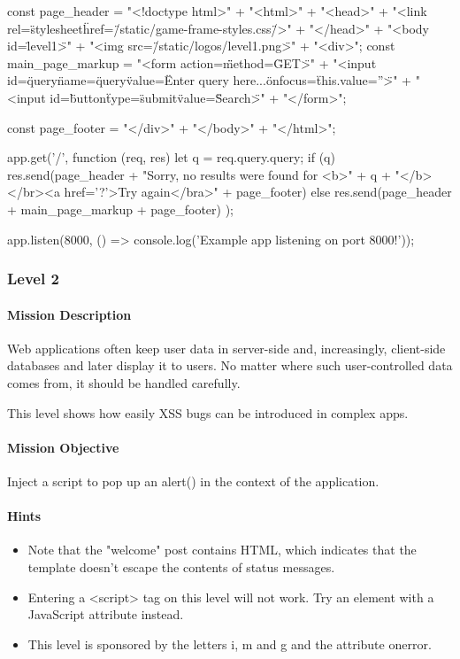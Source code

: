 \begin{Exercise}[label={websec-xss-game}]
\begin{js}
const page_header = "<!doctype html>" +
  "<html>" +
  "<head>" +
  "<link rel=\"stylesheet\" href=\"/static/game-frame-styles.css\" />" +
  "</head>" +
  "<body id=\"level1\">" +
  "<img src=\"/static/logos/level1.png\">" +
  "<div>";
const main_page_markup =
  "<form action=\"\" method=\"GET\">" +
  "<input id=\"query\" 
  name=\"query\" 
  value=\"Enter query here...\" 
  onfocus=\"this.value=''\">" +
  "<input id=\"button\" type=\"submit\" value=\"Search\">" +
  "</form>";

const page_footer =
  "</div>" +
  "</body>" +
  "</html>";

app.get('/', function (req, res) {
  let q = req.query.query;
  if (q) {
    res.send(page_header +
    "Sorry, no results were found for <b>" + q + "</b></br><a href='?'>Try again</bra>" +
    page_footer)
  } else {
    res.send(page_header + main_page_markup + page_footer)
  }
});

app.listen(8000, () => console.log('Example app listening on port 8000!'));
\end{js}

	\subsubsection{Level 2}
\paragraph{Mission Description}
Web applications often keep user data in server-side and, increasingly, client-side databases and later display it to users. No matter where such user-controlled data comes from, it should be handled carefully. 

This level shows how easily XSS bugs can be introduced in complex apps.
\paragraph{Mission Objective}
Inject a script to pop up an alert() in the context of the application. 

\paragraph{Hints}
\begin{itemize}
\item Note that the "welcome" post contains HTML, which indicates that the template doesn't escape the contents of status messages.
\item Entering a <script> tag on this level will not work. Try an element with a JavaScript attribute instead.
\item This level is sponsored by the letters i, m and g and the attribute onerror.
\end{itemize}



\end{Exercise}
